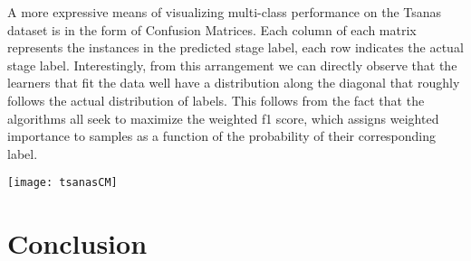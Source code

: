 \documentclass[12pt]{article}
\begin{document}
A more expressive means of visualizing multi-class performance on the Tsanas dataset is in the form of Confusion Matrices. Each column of each matrix represents the instances in the predicted stage label, each row indicates the actual stage label. Interestingly, from this arrangement we can directly observe that the learners that fit the data well have a distribution along the diagonal that roughly follows the actual distribution of labels. This follows from the fact that the algorithms all seek to maximize the weighted f1 score, which assigns weighted importance to samples as a function of the probability of their corresponding label.

\begin{figure}%
    \centering
    \qquad
    \label{fig:algorithm_perf}%
\end{figure}

\begin{center}
\texttt{[image: tsanasCM]}
\end{center}

\section{Conclusion}
\label{sec:conc}





\end{document}

